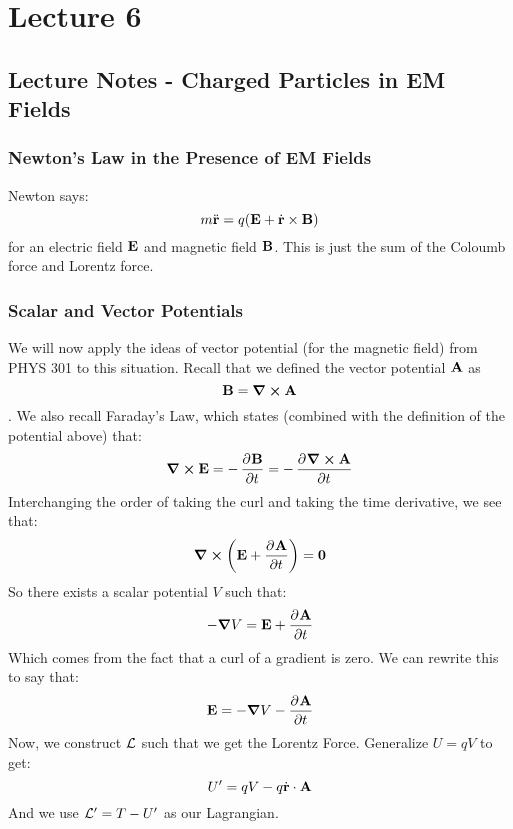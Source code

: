 \section{Lecture 6}
\subsection{Lecture Notes - Charged Particles in EM Fields}
\subsubsection{Newton's Law in the Presence of EM Fields}
Newton says:
\[m\ddot{\mathbf{r}} = q(\mathbf{E} + \dot{\mathbf{r}}\times \mathbf{B})\] for an electric field $\mathbf{E}$ and magnetic field $\mathbf{B}$. This is just the sum of the Coloumb force and Lorentz force.

\subsubsection{Scalar and Vector Potentials}
We will now apply the ideas of vector potential (for the magnetic field) from PHYS 301 to this situation. Recall that we defined the vector potential $\mathbf{A}$ as \[\mathbf{B} = \curl{\ensuremath{\mathbf{A}}}\].
We also recall Faraday's Law, which states (combined with the definition of the potential above) that:
\[\curl{\v{E}} = -\dpd{\v{B}}{t} = -\dpd{\curl{\v{A}}}{t}\]
Interchanging the order of taking the curl and taking the time derivative, we see that:
\[\curl{\left(\v{E} + \dpd{\v{A}}{t}\right)} = \v{0}\]
So there exists a scalar potential $V$ such that:
\[-\grad{V} = \v{E} + \dpd{\v{A}}{t}\]
Which comes from the fact that a curl of a gradient is zero. We can rewrite this to say that:
\[\v{E} = -\grad{V} - \dpd{\v{A}}{t}\]
Now, we construct $\mathcal{L}$ such that we get the Lorentz Force. Generalize $U = qV$ to get:
\[U' = qV - q\dot{\mathbf{r}}\cdot\mathbf{A}\]
And we use $\mathcal{L}' = T - U'$ as our Lagrangian.


